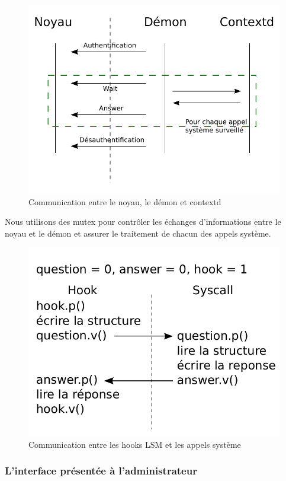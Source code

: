 \begin{figure}[hb]
	\centering
	\includegraphics{global.pdf}
	\caption{Communication entre le noyau, le démon et contextd}
\end{figure}


Nous utilisons des mutex pour contrôler les échanges d'informations entre le noyau et le démon et assurer le traitement de chacun des appels système.
\begin{figure}[hb]
	\centering
	\includegraphics{syscall_sync.pdf}
	\caption{Communication entre les hooks LSM et les appels système}
\end{figure}

\subsubsection{L'interface présentée à l'administrateur}

